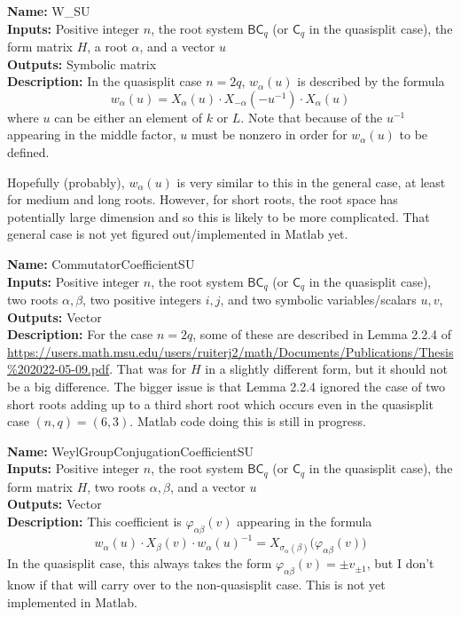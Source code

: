 \documentclass[12pt]{article}
\theoremstyle{definition}
\numberwithin{theorem}{subsection}
\newcommand{\sig}{\sigma}
\newcommand{\lp}{\left(}
\newcommand{\rp}{\right)}
\newcommand{\tbf}{\textbf}
\newcommand{\noi}{\noindent}
\newcommand{\inv}{^{-1}}
\begin{document}
\begin{framed}
\noi \tbf{Name:} W\_SU \\
\noi \tbf{Inputs:} Positive integer $n$, the root system $\mathsf{BC}_q$ (or $\mathsf{C}_q$ in the quasisplit case), the form matrix $H$, a root $\alpha$, and a vector $u$  \\
\noi \tbf{Outputs:} Symbolic matrix \\
\noi \tbf{Description:} In the quasisplit case $n=2q$, $w_\alpha(u)$ is described by the formula
\[
	w_\alpha(u) = X_{\alpha}(u) \cdot X_{-\alpha} \lp - u \inv \rp \cdot X_{\alpha}(u)
\]
where $u$ can be either an element of $k$ or $L$. Note that because of the $u \inv$ appearing in the middle factor, $u$ must be nonzero in order for $w_\alpha(u)$ to be defined. 

Hopefully (probably), $w_\alpha(u)$ is very similar to this in the general case, at least for medium and long roots. However, for short roots, the root space has potentially large dimension and so this is likely to be more complicated. That general case is not yet figured out/implemented in Matlab yet.
\end{framed}

\begin{framed}
\noi \tbf{Name:} CommutatorCoefficientSU \\
\noi \tbf{Inputs:} Positive integer $n$, the root system $\mathsf{BC}_q$ (or $\mathsf{C}_q$ in the quasisplit case), two roots $\alpha, \beta$, two positive integers $i,j$, and two symbolic variables/scalars $u,v$, \\
\noi \tbf{Outputs:} Vector \\
\noi \tbf{Description:} For the case $n=2q$, some of these are described in Lemma 2.2.4 of \url{https://users.math.msu.edu/users/ruiterj2/math/Documents/Publications/Thesis\%202022-05-09.pdf}. That was for $H$ in a slightly different form, but it should not be a big difference. The bigger issue is that Lemma 2.2.4 ignored the case of two short roots adding up to a third short root which occurs even in the quasisplit case $(n,q) = (6,3)$. Matlab code doing this is still in progress.
\end{framed}

\begin{framed}
\noi \tbf{Name:} WeylGroupConjugationCoefficientSU \\
\noi \tbf{Inputs:} Positive integer $n$, the root system $\mathsf{BC}_q$ (or $\mathsf{C}_q$ in the quasisplit case), the form matrix $H$, two roots $\alpha, \beta$, and a vector $u$ \\
\noi \tbf{Outputs:} Vector  \\
\noi \tbf{Description:} This coefficient is $\varphi_{\alpha \beta}(v)$ appearing in the formula
\[
	w_\alpha(u) \cdot X_\beta(v) \cdot w_\alpha(u) \inv = X_{\sig_\alpha(\beta)} \Big( \varphi_{\alpha \beta}(v) \Big)
\]
In the quasisplit case, this always takes the form $\varphi_{\alpha \beta}(v) = \pm v_{\pm 1}$, but I don't know if that will carry over to the non-quasisplit case. This is not yet implemented in Matlab.
\end{framed}

\newpage
\raggedright


\nocite{*}
\end{document}
